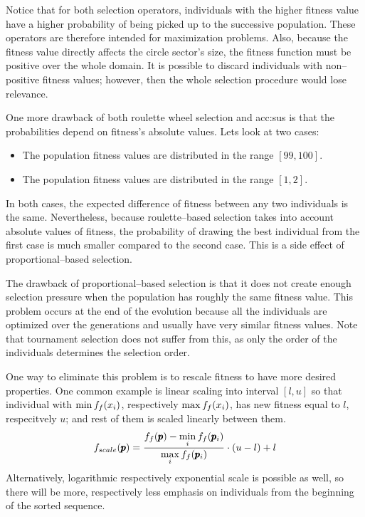 Notice that for both selection operators, individuals with the higher fitness value have a higher probability of being picked up to the successive population. These operators are therefore intended for maximization problems. Also, because the fitness value directly affects the circle sector's size, the fitness function must be positive over the whole domain. It is possible to discard individuals with non--positive fitness values; however, then the whole selection procedure would lose relevance.

One more drawback of both roulette wheel selection and \acrshort{acc:sus} is that the probabilities depend on fitness's absolute values. Lets look at two cases:
\begin{itemize}
    \item The population fitness values are distributed in the range $\left[ 99,100 \right]$.
    \item The population fitness values are distributed in the range $\left[ 1, 2\right]$.
\end{itemize}
In both cases, the expected difference of fitness between any two individuals is the same. Nevertheless, because roulette--based selection takes into account absolute values of fitness, the probability of drawing the best individual from the first case is much smaller compared to the second case. This is a side effect of proportional--based selection.

The drawback of proportional--based selection is that it does not create enough selection pressure when the population has roughly the same fitness value. This problem occurs at the end of the evolution because all the individuals are optimized over the generations and usually have very similar fitness values. Note that tournament selection does not suffer from this, as only the order of the individuals determines the selection order.

One way to eliminate this problem is to rescale fitness to have more desired properties. One common example is linear scaling into interval $\left[ l,u \right]$ so that individual with $\min f_f(x_i)$, respectively $\max f_f(x_i)$, has new fitness equal to $l$, respecitvely $u$; and rest of them is scaled linearly between them. 
$$
f_{scale}(\pmb{p})=\frac{f_f(\pmb{p}) - \min\limits_{i}f_f(\pmb{p}_i)}{\max\limits_{i}f_f(\pmb{p}_i)}\cdot(u-l)+l 
$$
Alternatively, logarithmic respectively exponential scale is possible as well, so there will be more, respectively less emphasis on individuals from the beginning of the sorted sequence.

